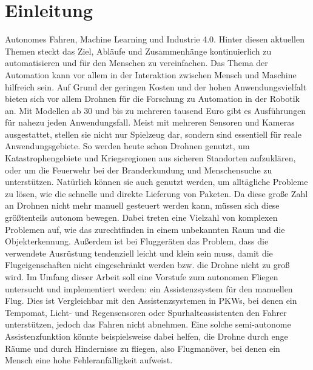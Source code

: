 

\pagestyle{plain}
\chapter{Einleitung}
\label{cha:Introduction}
Autonomes Fahren, Machine Learning und Industrie 4.0. Hinter diesen aktuellen Themen steckt das Ziel, Abläufe und Zusammenhänge kontinuierlich zu automatisieren und für den Menschen zu vereinfachen. Das Thema der Automation kann vor allem in der Interaktion zwischen Mensch und Maschine hilfreich sein. Auf Grund der geringen Kosten und der hohen Anwendungsvielfalt bieten sich vor allem Drohnen für die Forschung zu Automation in der Robotik an. \newline
Mit Modellen ab 30 und bis zu mehreren tausend Euro gibt es Ausführungen für nahezu jeden Anwendungsfall. Meist mit mehreren Sensoren und Kameras ausgestattet, stellen sie nicht nur Spielzeug dar, sondern sind essentiell für reale Anwendungsgebiete. \newline
So werden heute schon Drohnen genutzt, um Katastrophengebiete und Kriegsregionen aus sicheren Standorten aufzuklären, oder um die Feuerwehr bei der Branderkundung und Menschensuche zu unterstützen. \newline
Natürlich können sie auch genutzt werden, um alltägliche Probleme zu lösen, wie die schnelle und direkte Lieferung von Paketen. \newline
Da diese große Zahl an Drohnen nicht mehr manuell gesteuert werden kann, müssen sich diese größtenteils autonom bewegen. Dabei treten eine Vielzahl von komplexen Problemen auf, wie das zurechtfinden in einem unbekannten Raum und die Objekterkennung. \newline
Außerdem ist bei Fluggeräten das Problem, dass die verwendete Ausrüstung tendenziell leicht und klein sein muss, damit die Flugeigenschaften nicht eingeschränkt werden bzw. die Drohne nicht zu groß wird. \newline
Im Umfang dieser Arbeit soll eine Vorstufe zum autonomen Fliegen untersucht und implementiert werden: ein Assistenzsystem für den manuellen Flug. Dies ist Vergleichbar mit den Assistenzsystemen in PKWs, bei denen ein Tempomat, Licht- und Regensensoren oder Spurhalteassistenten den Fahrer unterstützen, jedoch das Fahren nicht abnehmen. \newline
Eine solche semi-autonome Assistenzfunktion könnte beispielsweise dabei helfen, die Drohne durch enge Räume und durch Hindernisse zu fliegen, also Flugmanöver, bei denen ein Mensch eine hohe Fehleranfälligkeit aufweist. \newline


